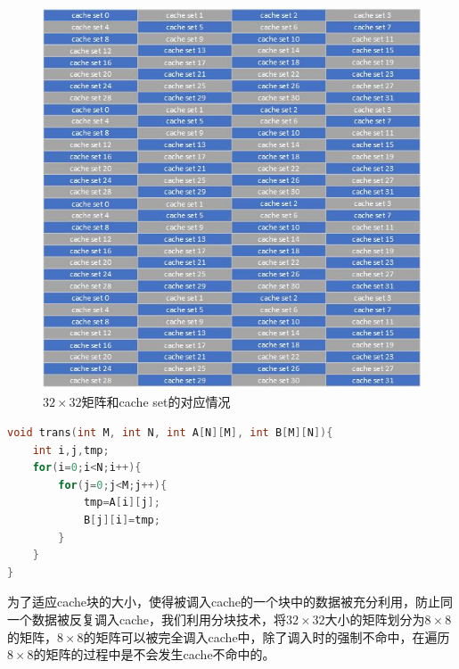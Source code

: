 \documentclass[supercite]{Experimental_Report}
\theoremstyle{definition}
\begin{document}
\begin{figure}[htb]
	\begin{center}
		\includegraphics[scale=0.7]{./images/lab2_1.jpg}
		\caption{$32\times32$矩阵和cache set的对应情况}
		\label{fig2-1}
	\end{center}
\end{figure}

\begin{lstlisting}[language=C,caption={简易的矩阵转置函数},label={lst:trans},float=htb]
void trans(int M, int N, int A[N][M], int B[M][N]){
    int i,j,tmp;
    for(i=0;i<N;i++){
        for(j=0;j<M;j++){
            tmp=A[i][j];
            B[j][i]=tmp;
        }
    }
}
\end{lstlisting}





为了适应cache块的大小，使得被调入cache的一个块中的数据被充分利用，防止同一个数据被反复调入cache，我们利用分块技术，将$32\times32$大小的矩阵划分为$8\times8$的矩阵，$8\times8$的矩阵可以被完全调入cache中，除了调入时的强制不命中，在遍历$8\times8$的矩阵的过程中是不会发生cache不命中的。
\end{document}
